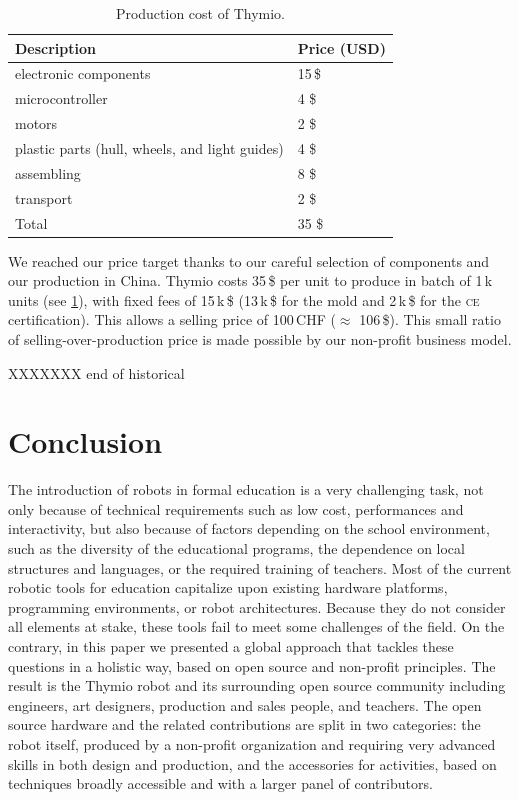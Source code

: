 \documentclass[letterpaper, 10 pt, conference]{ieeeconf}  %
\begin{document}
\begin{table}
\centering
\begin{tabularx}{\columnwidth}{ll}
\toprule
Description & Price (USD)\\
\midrule
electronic components & 15\,\$ \\
microcontroller & 4 \$ \\
motors & 2 \$ \\
plastic parts (hull, wheels, and light guides) & 4 \$ \\
assembling & 8 \$ \\
transport & 2 \$ \\
\bottomrule
Total & 35 \$ \\
\end{tabularx}
\caption{Production cost of Thymio.}
\label{tbl:thymio-price}
\end{table}

We reached our price target thanks to our careful selection of components and our production in China.
Thymio costs 35\,\$ per unit to produce in batch of 1\,k units (see \ref{tbl:thymio-price}), with fixed fees of 15\,k\,\$ (13\,k\,\$ for the mold and 2\,k\,\$ for the \textsc{ce} certification).
This allows a selling price of 100\,CHF ($\approx$ 106\,\$).
This small ratio of selling-over-production price is made possible by our non-profit business model.

XXXXXXX end of historical



\section{Conclusion}

The introduction of robots in formal education is a very challenging task, not only because of technical requirements such as low cost, performances and interactivity, but also because of factors depending on the school environment, such as the diversity of the educational programs, the dependence on local structures and languages, or the required training of teachers.
Most of the current robotic tools for education capitalize upon existing hardware platforms, programming environments, or robot architectures.
Because they do not consider all elements at stake, these tools fail to meet some challenges of the field.
On the contrary, in this paper we presented a global approach that tackles these questions in a holistic way, based on open source and non-profit principles.
The result is the Thymio robot and its surrounding open source community including engineers, art designers, production and sales people, and teachers.
The open source hardware and the related contributions are split in two categories: the robot itself, produced by a non-profit organization and requiring very advanced skills in both design and production, and the accessories for activities, based on techniques broadly accessible and with a larger panel of contributors.
\end{document}
